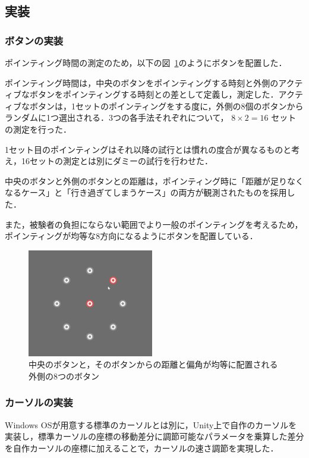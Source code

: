 \documentclass[a4paper, papersize, titlepage]{jsarticle}
\begin{document}
\begin{multicols}{2}
\subsection{実装}

\subsubsection{ボタンの実装}
ポインティング時間の測定のため，以下の図~\ref{button}のようにボタンを配置した．

ポインティング時間は，中央のボタンをポインティングする時刻と外側のアクティブなボタンをポインティングする時刻との差として定義し，測定した．アクティブなボタンは，1セットのポインティングをする度に，外側の8個のボタンからランダムに1つ選出される．3つの各手法それぞれについて， $8 \times 2 = 16$ セットの測定を行った．

1セット目のポインティングはそれ以降の試行とは慣れの度合が異なるものと考え，16セットの測定とは別にダミーの試行を行わせた．

中央のボタンと外側のボタンとの距離は，ポインティング時に「距離が足りなくなるケース」と「行き過ぎてしまうケース」の両方が観測されたものを採用した．

また，被験者の負担にならない範囲でより一般のポインティングを考えるため，ポインティングが均等な8方向になるようにボタンを配置している．

\begin{figure}[H]
 \centering
   \includegraphics[width=55mm]{button.png}
 \caption{中央のボタンと，そのボタンからの距離と偏角が均等に配置される外側の8つのボタン}
 \label{button}
\end{figure}
\noindent


\subsubsection{カーソルの実装}
Windows OSが用意する標準のカーソルとは別に，Unity上で自作のカーソルを実装し，標準カーソルの座標の移動差分に調節可能なパラメータを乗算した差分を自作カーソルの座標に加えることで，カーソルの速さ調節を実現した．


\end{multicols}
\end{document}
